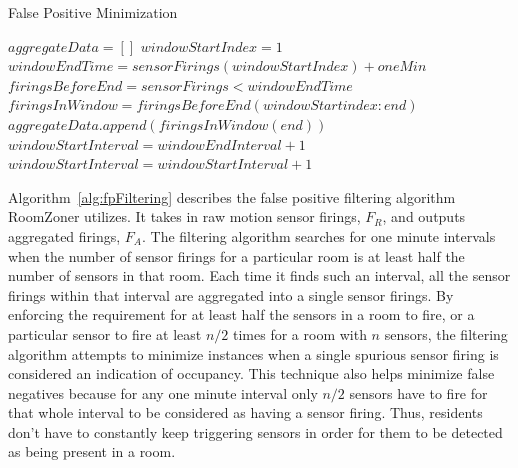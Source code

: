 \begin{algorithm}[!htb]                      %
\caption{False Positive Minimization}          %
\label{alg:fpFiltering}                           %
\begin{algorithmic}                    %
\STATE $aggregateData = []$
\STATE $windowStartIndex = 1$
\STATE $windowEndTime = sensorFirings(windowStartIndex) + oneMin$
\STATE $firingsBeforeEnd = sensorFirings < windowEndTime$
\STATE $firingsInWindow = firingsBeforeEnd(windowStartindex:end)$
\STATE $aggregateData.append(firingsInWindow(end))$
\STATE $windowStartInterval = windowEndInterval + 1$
\ELSE
\STATE $windowStartInterval = windowStartInterval + 1$
\ENDIF
\ENDWHILE
\end{algorithmic}
\end{algorithm}

Algorithm~\ref{alg:fpFiltering} describes the false positive filtering algorithm
RoomZoner utilizes. It takes in raw motion sensor firings, $F_R$, and outputs
aggregated firings, $F_A.$ The filtering algorithm searches for one minute
intervals when the number of sensor firings for a particular room is at least
half the number of sensors in that room. Each time it finds such an interval,
all the sensor firings within that interval are aggregated into a single sensor
firings. By enforcing the requirement for at least half the sensors in a room to
fire, or a particular sensor to fire at least $n/2$ times for a room with $n$
sensors, the filtering algorithm attempts to minimize instances when a single
spurious sensor firing is considered an indication of occupancy. This technique
also helps minimize false negatives because for any one minute interval only
$n/2$ sensors have to fire for that whole interval to be considered as having a
sensor firing. Thus, residents don't have to constantly keep triggering sensors
in order for them to be detected as being present in a room.

\begin{figure}[!htb]
\end{figure}

